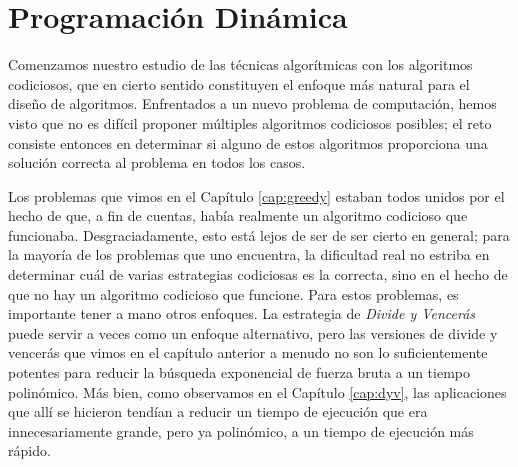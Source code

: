 \documentclass[a4paper, 12pt]{book}
\theoremstyle{dotless}
\begin{document}
\chapter{Programación Dinámica}


Comenzamos nuestro estudio de las técnicas algorítmicas con los algoritmos codiciosos, que en cierto sentido constituyen el enfoque más natural para el diseño de algoritmos. Enfrentados a un nuevo problema de computación, hemos visto que no es difícil proponer múltiples algoritmos codiciosos posibles; el reto consiste entonces en determinar si alguno de estos algoritmos proporciona una solución correcta al problema en todos los casos.

Los problemas que vimos en el Capítulo \ref{cap:greedy} estaban todos unidos por el hecho de que, a fin de cuentas, había realmente un algoritmo codicioso que funcionaba. Desgraciadamente, esto está lejos de ser de ser cierto en general; para la mayoría de los problemas que uno encuentra, la dificultad real no estriba en determinar cuál de varias estrategias codiciosas es la correcta, sino en el hecho de que no hay un algoritmo codicioso que funcione.
Para estos problemas, es importante tener a mano otros enfoques. La estrategia de \textit{Divide y Vencerás} puede servir a veces como un enfoque alternativo, pero las versiones de divide y vencerás que vimos en el capítulo anterior a menudo no son lo suficientemente potentes para reducir la búsqueda exponencial de fuerza bruta a un tiempo polinómico.
Más bien, como observamos en el Capítulo \ref{cap:dyv}, las aplicaciones que allí se hicieron tendían a reducir un tiempo de ejecución que era innecesariamente grande, pero ya polinómico, a un tiempo de ejecución más rápido.
\end{document}
